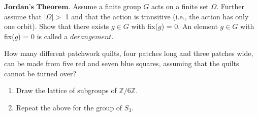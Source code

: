 \documentclass[12pt,letterpaper,boxed]{hmcpset}
\begin{document}
\begin{solution}
\end{solution}

\clearpage

\begin{problem}[8.1.4]
$\textbf{Jordan's Theorem.}$ Assume a finite group $G$ acts on a finite set $\Omega$. Further assume that $ | \Omega | >$ 1 and that the action is transitive (i.e., the action has only one orbit). Show that there exists $ g \in G $ with fix($g$) = 0. \newline
\hangindent=1cm An element $ g \in G $ with fix($g$) = 0 is called a $\textit{derangement}$.
\end{problem}

\begin{solution}
\end{solution}

\clearpage


\begin{problem}[8.2.2]
How many different patchwork quilts, four patches long and three patches wide, can be made from five red and seven blue squares, assuming that the quilts cannot be turned over?
\end{problem}

\begin{solution}
\end{solution}

\clearpage

\begin{problem}[9.1.3]
\begin{enumerate}[label=\alph*]
\item Draw the lattice of subgroups of $ \mathbb{Z}/6\mathbb{Z} $.
\item Repeat the above for the group of $S_3$.
\end{enumerate}
\end{problem}

\begin{solution}

\end{solution}
\end{document}
